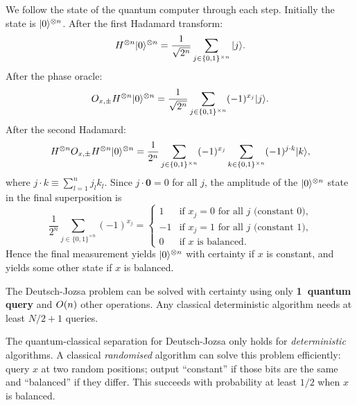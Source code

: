 We follow the state of the quantum computer through each step.  Initially
the state is $|0\rangle^{\otimes n}$.  After the first Hadamard transform:
\begin{equation}
  H^{\otimes n}|0\rangle^{\otimes n}
  = \frac{1}{\sqrt{2^n}}\sum_{j\in \{0,1\}^{\times n}} |j\rangle.
\end{equation}
After the phase oracle:
\begin{equation}
  O_{x,\pm} H^{\otimes n}|0\rangle^{\otimes n}
  = \frac{1}{\sqrt{2^n}}\sum_{j\in \{0,1\}^{\times n}} (-1)^{x_j}|j\rangle.
\end{equation}
After the second Hadamard:
\begin{equation}
  H^{\otimes n}O_{x,\pm} H^{\otimes n}|0\rangle^{\otimes n}
  = \frac{1}{2^n}\sum_{j\in \{0,1\}^{\times n}}(-1)^{x_j}
  \sum_{k\in \{0,1\}^{\times n}} (-1)^{j\cdot k}|k\rangle,
\end{equation}
where $j\cdot k \equiv \sum_{l=1}^n j_l k_l$.  Since
$j\cdot \mathbf{0} = 0$ for all $j$, the amplitude of the
$|0\rangle^{\otimes n}$ state in the final superposition is
\begin{equation}
  \frac{1}{2^n}\sum_{j\in \{0,1\}^{\times n}}(-1)^{x_j} = \begin{cases}
    1  & \text{if $x_j=0$ for all $j$ (constant $0$),} \\
    -1 & \text{if $x_j=1$ for all $j$ (constant $1$),} \\
    0  & \text{if $x$ is balanced.}
  \end{cases}
\end{equation}
Hence the final measurement yields $|0\rangle^{\otimes n}$ with certainty if $x$
is constant, and yields some other state if $x$ is balanced.

\begin{keyresult}
  The Deutsch-Jozsa problem can be solved with certainty using only
  \textbf{1~quantum query} and $O\!\left(n\right)$ other operations.  Any classical
  deterministic algorithm needs at least $N/2 + 1$ queries.
\end{keyresult}

\begin{remark}
  The quantum-classical separation for Deutsch-Jozsa only holds for
  \emph{deterministic} algorithms.  A classical \emph{randomised} algorithm
  can solve this problem efficiently: query $x$ at two random positions;
  output ``constant'' if those bits are the same and ``balanced'' if they
  differ.  This succeeds with probability at least $1/2$ when $x$ is
  balanced.
\end{remark}


